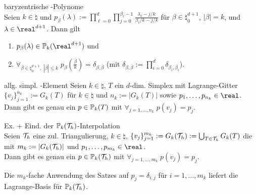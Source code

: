 \linie

\begin{Lemma}{baryzentrische -Polynome}\\
    Seien $k \in \natural$ und
    $p_\beta(\lambda) := \prod_{\ell=0}^d \prod_{j=0}^{\beta_\ell-1}
    \frac{\lambda_\ell - j/k}{\beta_\ell/k - j/k}$
    für $\beta \in \natural_0^{d+1}$, $|\beta| = k$, und $\lambda \in \real^{d+1}$.
    Dann gilt
    \begin{enumerate}
        \item
        $p_\beta(\lambda) \in \PP_k(\real^{d+1})$ und
        
        \item
        $\forall_{\overline{\beta} \in \natural_0^{d+1},\; |\overline{\beta}| \le k}\;
        p_\beta(\frac{\overline{\beta}}{k}) = \delta_{\beta,\overline{\beta}}$
        (mit $\delta_{\beta,\overline{\beta}} :=
        \prod_{i=0}^d \delta_{\beta_i,\overline{\beta_i}}$).
    \end{enumerate}
\end{Lemma}

\begin{Satz}{allg. simpl. -Element}
    Seien $k \in \natural$,
    $T$ ein $d$-dim. Simplex mit Lagrange-Gitter
    $\{v_j\}_{j=1}^{n_k} := G_k(T)$ für
    $k \in \natural$ und $n_k := |G_k(T)|$ sowie $p_1, \dotsc, p_{n_k} \in \real$.\\
    Dann gibt es genau ein $p \in \mathbb{P}_k(T)$ mit $\forall_{j=1,\dotsc,n_k}\; p(v_j) = p_j$.
\end{Satz}

\linie

\begin{Satz}{Ex. + Eind. der $\mathbb{P}_k(\mathcal{T}_h)$-Interpolation}\\
    Seien $\mathcal{T}_h$ eine zul. Triangulierung,
    $k \in \natural$,
    $\{v_j\}_{j=1}^{m_k} := G_k(\mathcal{T}_h) := \bigcup_{T \in \mathcal{T}_h} G_k(T)$
    die  mit
    $m_k := |G_k(\mathcal{T}_h)|$ und
    $p_1, \dotsc, p_{m_k} \in \real$.\\
    Dann gibt es genau ein $p \in \mathbb{P}_k(\mathcal{T}_h)$ mit
    $\forall_{j=1,\dotsc,m_k}\; p(v_j) = p_j$.
\end{Satz}

\linie

\begin{Bem}
    Die $m_k$-fache Anwendung des Satzes auf $p_j = \delta_{i,j}$ für
    $i = 1, \dotsc, m_k$ liefert die Lagrange-Basis für $\mathbb{P}_k(\mathcal{T}_h)$.
\end{Bem}

